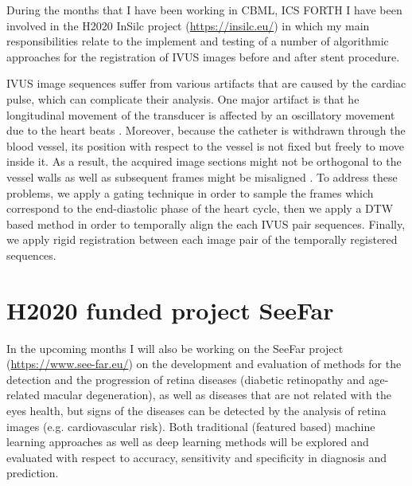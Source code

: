 \documentclass{article}
\begin{document}
During the months that I have been working in CBML, ICS FORTH I have been involved in the H2020 InSilc project (\url{https://insilc.eu/}) in which my main responsibilities relate to the implement and testing of a number of algorithmic approaches for the registration of IVUS images before and after stent procedure.

IVUS image sequences suffer from various artifacts that are caused by the cardiac pulse, which can complicate their analysis. One major artifact is that he longitudinal movement of the transducer is affected by an oscillatory movement due to the heart beats \cite{alberti2012automatic}. Moreover, because the catheter is withdrawn through the blood vessel, its position with respect to the vessel is not fixed but freely to move inside it. As a result, the acquired image sections might not be orthogonal to the vessel walls \cite{gatta2008robust} as well as subsequent frames might be misaligned \cite{alberti2012automatic}. To address these problems, we apply a gating technique in order to sample the frames which correspond to the end-diastolic phase of the heart cycle, then we apply a DTW based method in order to temporally align the each IVUS pair sequences. Finally, we apply rigid registration between each image pair of the temporally registered sequences.


\section{H2020 funded project SeeFar}

In the upcoming months I will also be working on the SeeFar project (\url{https://www.see-far.eu/}) on the development and evaluation of methods for the detection and the progression of retina diseases (diabetic retinopathy and  age-related macular degeneration), as well as diseases that are not related with the eyes health, but signs of the diseases can be detected by the analysis of retina images (e.g. cardiovascular risk). Both traditional (featured based) machine learning approaches as well as deep learning methods will be explored and evaluated  with respect to accuracy, sensitivity and specificity in diagnosis and prediction.





\end{document}

